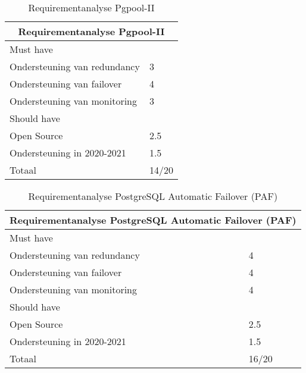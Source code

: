 \begin{table}
\begin{tabular}{ |p{6cm}||p{6cm}|  }
    \hline
    \multicolumn{2}{|c|}{Requirementanalyse Pgpool-II} \\
    \hline
    Must have & \\
    \hline
    Ondersteuning van redundancy  & 3 \\
    Ondersteuning van failover &  4 \\
    Ondersteuning van monitoring & 3 \\
    \hline
    Should have & \\
    \hline
    Open Source &  2.5 \\
    Ondersteuning in 2020-2021 & 1.5 \\
    \hline
    \hline
    Totaal & 14/20 \\
    \hline
\end{tabular}
\caption{Requirementanalyse Pgpool-II}
\label{table:Requirementanalyse Pgpool-II}
\end{table}

\begin{table}
\begin{tabular}{ |p{6cm}||p{6cm}|  }
    \hline
    \multicolumn{2}{|c|}{Requirementanalyse PostgreSQL Automatic Failover (PAF)} \\
    \hline
    Must have & \\
    \hline
    Ondersteuning van redundancy  & 4 \\
    Ondersteuning van failover &  4 \\
    Ondersteuning van monitoring & 4 \\
    \hline
    Should have & \\
    \hline
    Open Source &  2.5 \\
    Ondersteuning in 2020-2021 & 1.5 \\
    \hline
    \hline
    Totaal & 16/20 \\
    \hline    
\end{tabular}
\caption{Requirementanalyse PostgreSQL Automatic Failover (PAF)}
\label{table:Requirementanalyse PostgreSQL Automatic Failover (PAF)}
\end{table}


